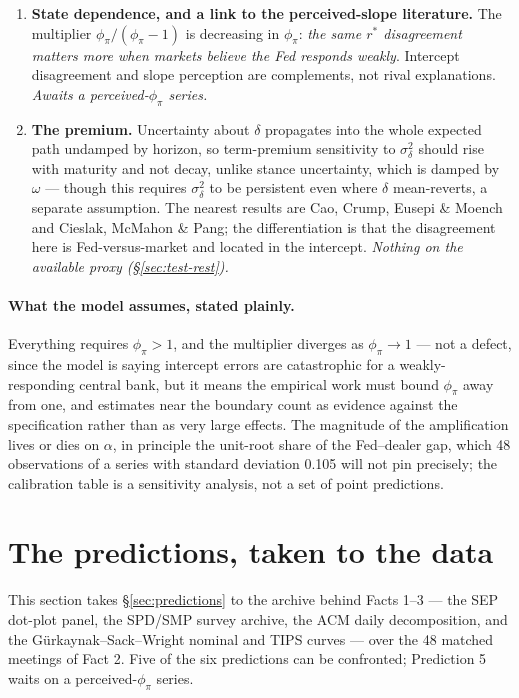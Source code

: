 \documentclass[11pt]{article}
\begin{document}
\begin{enumerate}
{all of it is real.}
\item \textbf{State dependence, and a link to the perceived-slope literature.} The multiplier
$\phi_\pi/(\phi_\pi-1)$ is decreasing in $\phi_\pi$: \emph{the same $r^{*}$ disagreement matters
more when markets believe the Fed responds weakly}. Intercept disagreement and slope perception
are complements, not rival explanations. \emph{Awaits a perceived-$\phi_\pi$ series.}
\item \textbf{The premium.} Uncertainty about $\delta$ propagates into the whole expected path
undamped by horizon, so term-premium sensitivity to $\sigma^2_\delta$ should rise with maturity
and not decay, unlike stance uncertainty, which is damped by $\omega$ --- though this requires
$\sigma^2_\delta$ to be persistent even where $\delta$ mean-reverts, a separate assumption. The
nearest results are Cao, Crump, Eusepi \& Moench and Cieslak, McMahon \& Pang; the
differentiation is that the disagreement here is Fed-versus-market and located in the intercept.
\emph{Nothing on the available proxy (\S\ref{sec:test-rest}).}
\end{enumerate}
\paragraph{What the model assumes, stated plainly.} Everything requires $\phi_\pi>1$, and the
multiplier diverges as $\phi_\pi\to1$ --- not a defect, since the model is saying intercept
errors are catastrophic for a weakly-responding central bank, but it means the empirical work
must bound $\phi_\pi$ away from one, and estimates near the boundary count as evidence against
the specification rather than as very large effects. The magnitude of the amplification lives or
dies on $\alpha$, in principle the unit-root share of the Fed--dealer gap, which 48 observations
of a series with standard deviation 0.105 will not pin precisely; the calibration table is a
sensitivity analysis, not a set of point predictions.
\section{The predictions, taken to the data}
\label{sec:tests}
This section takes \S\ref{sec:predictions} to the archive behind Facts 1--3 --- the SEP dot-plot
panel, the SPD/SMP survey archive, the ACM daily decomposition, and the G\"urkaynak--Sack--Wright
nominal and TIPS curves --- over the 48 matched meetings of Fact 2. Five of the six predictions
can be confronted; Prediction 5 waits on a perceived-$\phi_\pi$ series.
\end{document}
